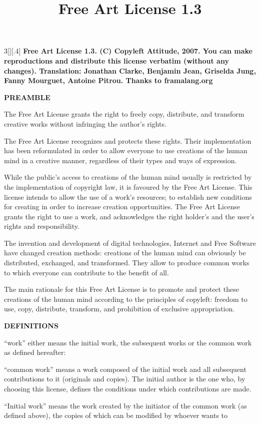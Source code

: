 \documentclass[8pt,a4paper]{article}
\title{Free Art License 1.3}
\begin{document}
%
%
\begin{multicols}{3}[][.4\paperwidth]%
{%
\textbf{%
Free Art License 1.3.
(C) Copyleft Attitude, 2007.
You can make reproductions and distribute this license verbatim (without any changes).
Translation: Jonathan Clarke, Benjamin Jean, Griselda Jung, Fanny Mourguet, Antoine Pitrou.
Thanks to framalang.org
}}

\bigskip

\textbf{PREAMBLE}

The Free Art License grants the right to freely copy, distribute, and transform creative works without infringing the author's rights.

The Free Art License recognizes and protects these rights. Their implementation has been reformulated in order to allow everyone to use creations of the human mind in a creative manner, regardless of their types and ways of expression.

While the public's access to creations of the human mind usually is restricted by the implementation of copyright law, it is favoured by the Free Art License. This license intends to allow the use of a work’s resources; to establish new conditions for creating in order to increase creation opportunities. The Free Art License grants the right to use a work, and acknowledges the right holder’s and the user’s rights and responsibility.

The invention and development of digital technologies, Internet and Free Software have changed creation methods: creations of the human mind can obviously be distributed, exchanged, and transformed. They allow to produce common works to which everyone can contribute to the benefit of all.

The main rationale for this Free Art License is to promote and protect these creations of the human mind according to the principles of copyleft: freedom to use, copy, distribute, transform, and prohibition of exclusive appropriation. 


\textbf{DEFINITIONS}

``\textrm{work}'' either means the initial work, the subsequent works or the common work as defined hereafter:

``\textrm{common work}'' means a work composed of the initial work and all subsequent contributions to it (originals and copies). The initial author is the one who, by choosing this license, defines the conditions under which contributions are made.

``\textrm{Initial work}'' means the work created by the initiator of the common work (as defined above), the copies of which can be modified by whoever wants to


\end{multicols}
\end{document}
